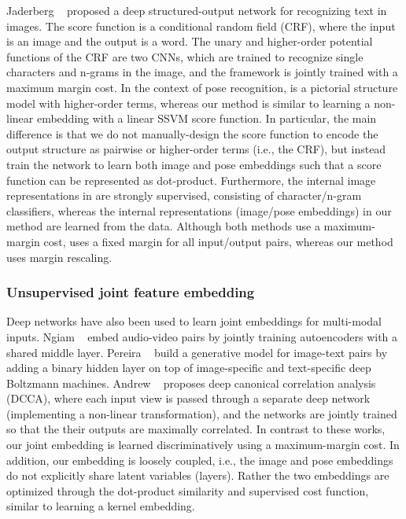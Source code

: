 \documentclass[10pt,twocolumn,letterpaper]{article}
\begin{document}
Jaderberg \etal~\cite{deepstruct2015} proposed a deep structured-output network for recognizing text in images. The score function is a conditional random field (CRF), where the input is an image and the output is a word.  The unary and higher-order potential functions of the CRF are two CNNs, which are trained to recognize single characters and n-grams in the image, and the framework is jointly trained with a maximum margin cost.
In the context of pose recognition, \cite{deepstruct2015} is a pictorial structure model with higher-order terms, whereas our method is similar to learning a non-linear embedding with a linear SSVM score function.
In particular, the main difference is that we do not manually-design the score function to encode the output structure as pairwise or higher-order terms (i.e., the CRF), but instead train the network to learn both image and pose embeddings such that a score function can be represented as dot-product.  Furthermore, the internal image representations in \cite{deepstruct2015} are strongly supervised, consisting of 
 character/n-gram classifiers, whereas the internal representations (image/pose embeddings) in our method are learned from the data.
Although both methods use a maximum-margin cost, \cite{deepstruct2015}  uses a fixed margin for all input/output pairs, whereas our method uses margin rescaling.


\vspace{-0.05in}
\subsubsection{Unsupervised joint feature embedding}

\vspace{-0.05in}
Deep networks have also been used to learn joint embeddings for multi-modal inputs. Ngiam \etal~\cite{multimodelDL2011} embed audio-video pairs by jointly training autoencoders  with a shared middle layer.
Pereira \etal~\cite{multimodelDBN2012} build a generative model for image-text pairs by adding a binary hidden layer on top of image-specific and text-specific deep Boltzmann machines.
Andrew \etal~\cite{DCCA} proposes deep canonical correlation analysis (DCCA), 
where each input view is passed through a separate deep network (implementing a non-linear transformation), 
and the networks are jointly trained so that the their outputs are maximally correlated.
In contrast to these works, our joint embedding is learned discriminatively using a maximum-margin cost.  In addition, our embedding is loosely coupled, i.e., the image and pose embeddings do not explicitly share latent variables (layers).  Rather the two embeddings are optimized through the dot-product similarity and supervised cost function, similar to learning a kernel embedding.
   
\end{document}
